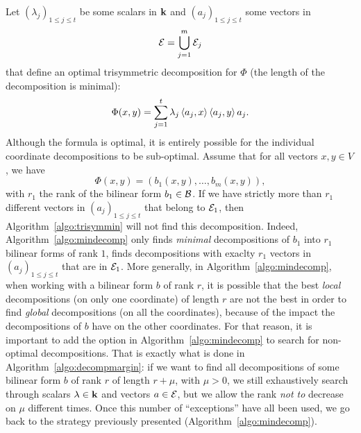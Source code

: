 Let $(\lambda_j)_{1\leq j\leq t}$ be some scalars in $\mathbf{k}$ and $(a_j)_{1\leq
j\leq t}$ some vectors in
\[
  \mathcal{E}=\bigcup_{j=1}^m\mathcal{E}_j
\]
that define an optimal trisymmetric decomposition for $\Phi$
(\ie the length of the decomposition is minimal): 
\[
  \Phi(x, y) = \sum_{j=1}^t\lambda_j\left\langle a_j,x\right\rangle\left\langle a_j,y\right\rangle a_j.
\]
Although the formula is optimal, it is entirely possible for the individual
coordinate decompositions to be sub-optimal. Assume that for all vectors $x,
y\in V$, we have
\[
  \Phi(x, y) = (b_1(x, y), \dots, b_m(x, y)),
\]
with $r_1$ the rank of the bilinear form $b_1\in\mathcal{B}$. If we have strictly more
than $r_1$ different vectors in $(a_j)_{1\leq j\leq t}$ that belong to $\mathcal{E}_1$,
then Algorithm~\ref{algo:trisymmin} will not find this decomposition. Indeed,
Algorithm~\ref{algo:mindecomp} only finds \emph{minimal} decompositions of $b_1$
into $r_1$ bilinear forms of rank $1$, \ie finds decompositions with exaclty
$r_1$ vectors in $(a_j)_{1\leq j\leq t}$ that are in $\mathcal{E}_1$. More generally, in
Algorithm~\ref{algo:mindecomp}, when working with a bilinear form $b$ of rank
$r$, it is possible that the best \emph{local} decompositions (\ie on only one
coordinate) of length $r$ are not the best in order to find \emph{global}
decompositions (\ie on all the coordinates), because of the impact the
decompositions of $b$ have on the other coordinates. For that reason, it is
important to add the option in Algorithm~\ref{algo:mindecomp} to search for
non-optimal decompositions. That is exactly what is done in
Algorithm~\ref{algo:decompmargin}: if we want to find all decompositions of some
bilinear form $b$ of rank $r$ of length $r+\mu$, with $\mu>0$, we still
exhaustively search through scalars $\lambda\in\mathbf{k}$ and vectors $a\in\mathcal{E}$, but we
allow the rank \emph{not to} decrease on $\mu$ different times. Once this number
of ``exceptions'' have all been used, we go back to the strategy previously
presented (\ie Algorithm~\ref{algo:mindecomp}).
